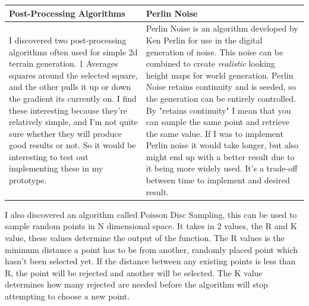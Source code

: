 \begin{flushleft}
                    \begin{center}
                        \begin{tabular}{| L{6cm} | L{6cm} |}
                            \hline
                            {\large Post-Processing Algorithms} & {\large Perlin Noise} \\
                            \hline
                            I discovered two post-processing algorithms often used for simple 2d terrain generation. 1 Averages squares 
                            around the selected square, and the other pulls it up or down the gradient its currently on.
                            I find these interesting because they're relatively simple, and I'm not quite sure whether they will produce good results or not. 
                            So it would be interesting to test out implementing these in my prototype.
                            &
                            Perlin Noise is an algorithm developed by Ken Perlin for use in the digital generation of noise.
                            This noise can be combined to create \textit{realistic} looking height maps for world generation.
                            Perlin Noise retains continuity and is seeded, so the generation can be entirely controlled.
                            By "retains continuity" I mean that you can sample the same point and retrieve the same value. 
                            If I was to implement Perlin noise it would take longer, but also might end up with a better result
                            due to it being more widely used. It's a trade-off between time to implement and desired result. \\
                            \hline
                        \end{tabular}
                    \end{center}
                    
                    I also discovered an algorithm called Poisson Disc Sampling, this can be used to sample random points 
                    in N dimensional space. It takes in 2 values, the R and K value, these values determine the output of
                    the function. The R values is the minimum distance a point has to be from another, randomly placed point
                    which hasn't been selected yet. If the distance between any existing points is less than R, the point
                    will be rejected and another will be selected. The K value determines how many rejected are needed before 
                    the algorithm will stop attempting to choose a new point.

\end{flushleft}
